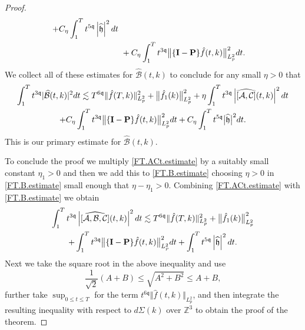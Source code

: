 \documentclass[10pt,a4paper]{amsart}
\newcommand{\Z}{\mathbb{Z}}
\newcommand{\micro}{{\bf \{I- P\}}}
\def\norm#1{\big\Vert#1\big\Vert}
\newcommand{\pv}{p}
\newcommand{\qq}{\mathfrak{q}}
\newcommand{\tTq}{t^{3\qq}}
\begin{document}
\begin{proof}
\begin{align*}
  +C_\eta\int_1^{T} t^{5\qq}\left| \widehat{\mathfrak{h}}\right|^2dt
  \\
&~
+C_\eta\int_1^{T} \tTq\norm{\micro \hat{f}(t,k)}_{L^2_{\pv}}^2dt.
\end{align*}
We collect all of these estimates for $\widehat{\mathcal{B}}(t,k)$ to conclude for any small $\eta>0$ that 
\begin{multline}\label{FT.B.estimate}
\int_1^{T} \tTq|\widehat{\mathcal{B}}(t,k)|^2  dt
\lesssim
 T^{6\qq}\Vert \hat{f}(T,k)\Vert_{L^2_{\pv}}^2+\norm{ \hat{f}_1(k)}_{L^2_{\pv}}^2
 +
\eta \int^{T}_{1} \tTq \left|\widehat{[\mathcal{A},\mathcal{C}]}(t,k)\right|^2 dt
 \\
+C_\eta\int_1^{T} \tTq\norm{\micro \hat{f}(t,k)}_{L^2_{\pv}}^2dt
+C_\eta\int_1^{T} t^{5\qq}\big|\widehat{\mathfrak{h}}\big|^2dt.
\end{multline}
This is our primary estimate for $\widehat{\mathcal{B}}(t,k)$.



To conclude the proof we multiply \eqref{FT.ACt.estimate} by a suitably small constant $\eta_1>0$ and then we add this to \eqref{FT.B.estimate} choosing $\eta>0$ in \eqref{FT.B.estimate} small enough that $\eta-\eta_1>0$.  Combining \eqref{FT.ACt.estimate} with \eqref{FT.B.estimate} we obtain
\begin{multline*}
    \int^{T}_{1} \tTq \left|\widehat{[\mathcal{A},\mathcal{B},\mathcal{C}]}(t,k)\right|^2 dt
    \lesssim
     T^{6\qq}\Vert \hat{f}(T,k)\Vert_{L^2_{\pv}}^2+\norm{ \hat{f}_1(k)}_{L^2_{\pv}}^2
 \\
+\int_1^{T} \tTq\norm{\micro \hat{f}(t,k)}_{L^2_{\pv}}^2dt
+\int_1^{T} t^{5\qq}\left| \widehat{\mathfrak{h}}\right|^2dt.
\end{multline*}
Next we take the square root in the above inequality and use 
\begin{equation}
\label{sqrt.ineq}
\frac{1}{\sqrt{2}} (A+B)\leq \sqrt{A^2+B^2}\leq A+B,
\end{equation}
further take $\sup_{0\le t\le T}$ for the term $t^{6\qq}\Vert \hat{f}( t,k)\Vert_{L^2_{\pv}}$,
and then integrate the resulting inequality with respect to $d\Sigma(k)$ over $\Z^3$ to obtain the proof of the theorem.
\end{proof}
\end{document}
